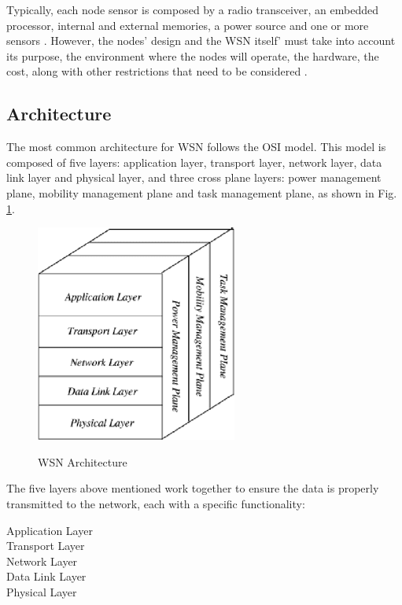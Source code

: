 Typically, each node sensor is composed by a radio transceiver, an embedded processor, internal
and external memories, a power source and one or more sensors \cite{Wang2010}. However, the
nodes' design and the WSN itself' must take into account its purpose, the environment where
the nodes will operate, the hardware, the cost, along with other restrictions that need to
be considered \cite{Yick2008}.


\subsection{Architecture}
\label{subsec:wsn_architecture}
The most common architecture for WSN follows the OSI model. This model is composed of five
layers: application layer, transport layer, network layer, data link layer and physical layer,
and three cross plane layers: power management plane, mobility management plane and task
management plane, as shown in Fig. \ref{fig:wsn_architecture}.

\begin{figure}[h]
    \caption{WSN Architecture \cite{Akyildiz2002}}
    \centering
    \includegraphics[scale=0.5]{Chapters/Figures/wsn_architecture.png}
    \label{fig:wsn_architecture}
\end{figure}

The five layers above mentioned work together to ensure the data is properly transmitted to the
network, each with a specific functionality:
\begin{description}
    \item[Application Layer]
    \item[Transport Layer]
    \item[Network Layer]
    \item[Data Link Layer]
    \item[Physical Layer]
\end{description}

